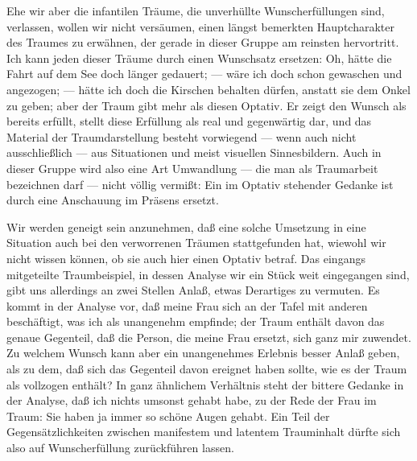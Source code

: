 \documentclass[twoside=true,titlepage=false,open=any, parskip=never, fontsize=10pt, headings=small, chapterprefix=false, appendixprefix=false]{scrbook}
\begin{document}
         
            
            
            
        \pstart
        Ehe wir aber die infantilen Träume, die unverhüllte Wunscherfüllungen
               sind, verlassen, wollen wir nicht versäumen, einen längst bemerkten
               Hauptcharakter des Traumes zu erwähnen, der gerade in dieser Gruppe am reinsten
               hervortritt. Ich kann jeden dieser Träume durch einen Wunschsatz ersetzen: Oh,
               hätte die Fahrt auf dem See doch länger gedauert; — wäre ich doch schon
               gewaschen und angezogen; — hätte ich doch die Kirschen behalten dürfen, anstatt
               sie dem Onkel zu geben; aber der Traum gibt mehr als diesen Optativ. Er zeigt
               den Wunsch als bereits erfüllt, stellt diese Erfüllung als real und gegenwärtig
               dar, und das Material der Traumdarstellung besteht vorwiegend — wenn auch
               nicht ausschließlich — aus Situationen und meist visuellen Sinnesbildern. Auch
               in dieser Gruppe wird also eine Art Umwandlung — die man als Traumarbeit
               bezeichnen darf — nicht völlig vermißt: Ein im
                  Optativ stehender Gedanke ist durch eine Anschauung im Präsens ersetzt.
        \pend
    
         
            
            
            \pstart[\section{IV}]\pend
            
        \pstart
        Wir werden geneigt sein anzunehmen, daß eine solche Umsetzung in eine
               Situation auch bei den verworrenen Träumen stattgefunden hat, wiewohl wir nicht
               wissen können, ob sie auch hier einen Optativ betraf. Das eingangs mitgeteilte
                  Traumbeispiel, in dessen Analyse wir ein Stück weit eingegangen
               sind, gibt uns allerdings an zwei Stellen Anlaß, etwas Derartiges zu
               vermuten. Es kommt in der Analyse vor, daß meine Frau sich an der Tafel mit
               anderen beschäftigt, was ich als unangenehm empfinde; der Traum enthält davon
               das genaue Gegenteil, daß die Person, die meine
               Frau ersetzt, sich ganz mir zuwendet. Zu welchem Wunsch kann aber ein
               unangenehmes Erlebnis besser Anlaß geben, als zu dem, daß sich das Gegenteil
               davon ereignet haben sollte, wie es der Traum als vollzogen enthält? In
               ganz ähnlichem Verhältnis steht der bittere Gedanke in der Analyse, daß ich
               nichts umsonst gehabt habe, zu der Rede der Frau im Traum: Sie haben ja immer so
               schöne Augen gehabt. Ein Teil der Gegensätzlichkeiten zwischen manifestem
               und latentem Trauminhalt dürfte sich also auf Wunscherfüllung zurückführen
               lassen.
        \pend
    
\end{document}
